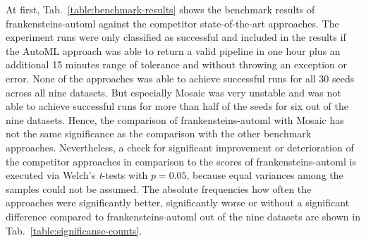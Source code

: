 At first, Tab.~\ref{table:benchmark-results} shows the benchmark results of frankensteins-automl against the competitor state-of-the-art approaches.
The experiment runs were only classified as successful and included in the results if the AutoML approach was able to return a valid pipeline in one hour plus an additional 15 minutes range of tolerance and without throwing an exception or error.\newline
None of the approaches was able to achieve successful runs for all 30 seeds across all nine datasets.
But especially Mosaic was very unstable and was not able to achieve successful runs for more than half of the seeds for six out of the nine datasets.
Hence, the comparison of frankensteins-automl with Mosaic has not the same significance as the comparison with the other benchmark approaches.\newline
Nevertheless, a check for significant improvement or deterioration of the competitor approaches in comparison to the scores of frankensteins-automl is executed via Welch's \textit{t}-tests with $p = 0.05$, because equal variances among the samples could not be assumed.
The absolute frequencies how often the approaches were significantly better, significantly worse or without a significant difference compared to frankensteins-automl out of the nine datasets are shown in Tab.~\ref{table:significanse-counts}.

